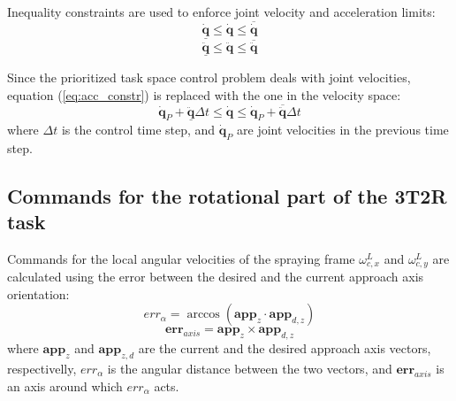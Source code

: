 Inequality constraints are used to enforce joint velocity and acceleration limits:
\begin{equation}
\underline{\dot{\boldsymbol{q}}} \leq \dot{\boldsymbol{q}} \leq \overline{\dot{\boldsymbol{q}}}
\end{equation}
\begin{equation}
\label{eq:acc_constr}
\underline{\ddot{\boldsymbol{q}}} \leq \ddot{\boldsymbol{q}} \leq \overline{\ddot{\boldsymbol{q}}}
\end{equation}

Since the prioritized task space control problem deals with joint velocities, equation (\ref{eq:acc_constr}) is replaced with the one in the velocity space:
\begin{equation}
\dot{\boldsymbol{q}}_P + \underline{\ddot{\boldsymbol{q}}}\Delta t \leq \dot{\boldsymbol{q}} \leq \dot{\boldsymbol{q}}_P + \overline{\ddot{\boldsymbol{q}}}\Delta t
\end{equation}
where $\Delta t$ is the control time step, and $\dot{\boldsymbol{q}}_P$ are joint velocities in the previous time step.

\subsection{Commands for the rotational part of the 3T2R task}
Commands for the local angular velocities of the spraying frame $\omega^L_{c,x}$ and $\omega^L_{c,y}$ are calculated using the error between the desired and the current approach axis orientation:
\begin{equation}
err_{\alpha} = \arccos( \boldsymbol{app}_{z} \cdot \boldsymbol{app}_{d,z} )
\end{equation}
\begin{equation}
\boldsymbol{err}_{axis} = \boldsymbol{app}_{z} \times \boldsymbol{app}_{d,z}
\end{equation}
where $\boldsymbol{app}_{z}$ and $\boldsymbol{app}_{z,d}$ are the current and the desired approach axis vectors, respectivelly, $err_{\alpha}$ is the angular distance between the two vectors, and $\boldsymbol{err}_{axis}$ is an axis around which $err_{\alpha}$ acts. 

